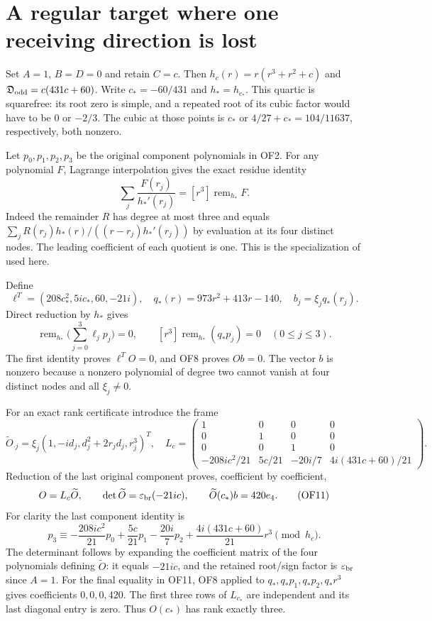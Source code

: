 \documentclass[11pt]{article}
\newcommand{\dd}{\mathfrak D_{\rm odd}}
\newcommand{\rem}{\operatorname{rem}}
\begin{document}
\section{A regular target where one receiving direction is lost}
Set $A=1$, $B=D=0$ and retain $C=c$. Then
$h_c(r)=r(r^3+r^2+c)$ and $\dd=c(431c+60)$.
Write $c_*=-60/431$ and $h_*=h_{c_*}$. This quartic is squarefree:
its root zero is simple, and a repeated root of its cubic factor
would have to be $0$ or $-2/3$. The cubic at those points is $c_*$
or $4/27+c_*=104/11637$, respectively, both nonzero.

Let $p_0,p_1,p_2,p_3$ be the original component polynomials in OF2.
For any polynomial $F$, Lagrange interpolation gives the exact
residue identity
\begin{equation}
 \sum_j\frac{F(r_j)}{h_*'(r_j)}=[r^3]\rem_{h_*}F.\tag{OF8}
\end{equation}
Indeed the remainder $R$ has degree at most three and equals
$\sum_jR(r_j)h_*(r)/((r-r_j)h_*'(r_j))$ by evaluation at its four
distinct nodes. The leading coefficient of each quotient is one.
This is the specialization of \cite[3.3.1--3.3.3\_1]{Temme} used here.

Define
\begin{equation}
 \ell^T=(208c_*^2,5ic_*,60,-21i),\quad
 q_*(r)=973r^2+413r-140,\quad b_j=\xi_jq_*(r_j).
 \tag{OF9}
\end{equation}
Direct reduction by $h_*$ gives
\[
 \rem_{h_*}\Big(\sum_{j=0}^3\ell_jp_j\Big)=0,
 \qquad [r^3]\rem_{h_*}(q_*p_j)=0\quad(0\le j\le3).
\]
The first identity proves $\ell^TO=0$, and OF8 proves $Ob=0$.
The vector $b$ is nonzero because a nonzero polynomial of degree two
cannot vanish at four distinct nodes and all $\xi_j\ne0$.

For an exact rank certificate introduce the frame
\begin{equation}
 \widetilde O_{\cdot j}=\xi_j(1,-id_j,d_j^2+2r_jd_j,r_j^3)^T,
 \quad
 L_c=\begin{pmatrix}
 1&0&0&0\\0&1&0&0\\0&0&1&0\\
 -208ic^2/21&5c/21&-20i/7&4i(431c+60)/21
 \end{pmatrix}.\tag{OF10}
\end{equation}
Reduction of the last original component proves, coefficient by
coefficient,
\begin{equation}
 O=L_c\widetilde O,\qquad
 \det\widetilde O=\varepsilon_{\rm br}(-21ic),\qquad
 \widetilde O(c_*)b=420e_4.\tag{OF11}
\end{equation}
For clarity the last component identity is
\[
 p_3\equiv-\frac{208ic^2}{21}p_0+\frac{5c}{21}p_1
 -\frac{20i}{7}p_2+\frac{4i(431c+60)}{21}r^3\pmod{h_c}.
\]
The determinant follows by expanding the coefficient matrix of the
four polynomials defining $\widetilde O$: it equals $-21ic$, and
the retained root/sign factor is $\varepsilon_{\rm br}$ since $A=1$.
For the final equality in OF11, OF8 applied to
$q_*,q_*p_1,q_*p_2,q_*r^3$ gives coefficients $0,0,0,420$.
The first three rows of $L_{c_*}$ are independent and its last
diagonal entry is zero. Thus $O(c_*)$ has rank exactly three.
\end{document}
